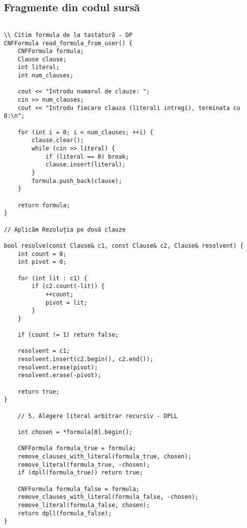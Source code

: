 \documentclass[12pt,a4paper]{article}
\begin{document}
\subsection{Fragmente din codul sursă}


\begin{verbatim}

\\ Citim formula de la tastatură - DP
CNFFormula read_formula_from_user() {
    CNFFormula formula;
    Clause clause;
    int literal;
    int num_clauses;

    cout << "Introdu numarul de clauze: ";
    cin >> num_clauses;
    cout << "Introdu fiecare clauza (literali intregi), terminata cu 0:\n";

    for (int i = 0; i < num_clauses; ++i) {
        clause.clear();
        while (cin >> literal) {
            if (literal == 0) break;
            clause.insert(literal);
        }
        formula.push_back(clause);
    }

    return formula;
}
          
// Aplicăm Rezoluția pe două clauze

bool resolve(const Clause& c1, const Clause& c2, Clause& resolvent) {
    int count = 0;
    int pivot = 0;

    for (int lit : c1) {
        if (c2.count(-lit)) {
            ++count;
            pivot = lit;
        }
    }

    if (count != 1) return false;

    resolvent = c1;
    resolvent.insert(c2.begin(), c2.end());
    resolvent.erase(pivot);
    resolvent.erase(-pivot);

    return true;
}

	// 5. Alegere literal arbitrar recursiv - DPLL
    
	int chosen = *formula[0].begin();

	CNFFormula formula_true = formula;
	remove_clauses_with_literal(formula_true, chosen);
	remove_literal(formula_true, -chosen);
	if (dpll(formula_true)) return true;

	CNFFormula formula_false = formula;
	remove_clauses_with_literal(formula_false, -chosen);
	remove_literal(formula_false, chosen);
	return dpll(formula_false);
}

\end{verbatim}
\end{document}
